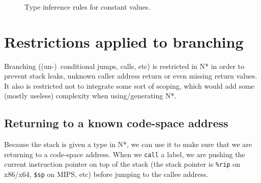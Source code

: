 \begin{figure}[htb]
  \centering

  \begin{prooftree}
  \end{prooftree}
  \\\vspace{\baselineskip}
  \begin{prooftree}
  \end{prooftree}
  \\\vspace{\baselineskip}
  \begin{prooftree}
  \end{prooftree}
  \\\vspace{\baselineskip}
  \begin{prooftree}
  \end{prooftree}

  \caption{Type inference rules for constant values.}
  \label{fig:nstar-common-constvalue-typerules}
\end{figure}

\section{Restrictions applied to branching}\label{sec:nstar-common-bs-restrictions}

Branching ((un-)\ conditional jumps, calls, etc) is restricted in N* in order to prevent stack leaks, unknown caller address return or even missing return values.
It also is restricted not to integrate some sort of scoping, which would add some (mostly useless) complexity when using/generating N*.

\subsection{Returning to a known code-space address}\label{subsec:nstar-common-bs-restrictions-ret}

Because the stack is given a type in N*, we can use it to make sure that we are returning to a code-space address.
When we \texttt{call} a label, we are pushing the current instruction pointer on top of the stack (the stack pointer is \texttt{\%rip} on x86/x64, \texttt{\$sp} on MIPS, etc) before jumping to the callee address.


